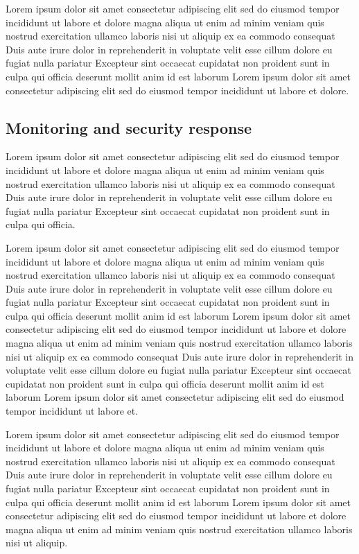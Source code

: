 Lorem ipsum dolor sit amet consectetur adipiscing elit sed do eiusmod tempor incididunt ut labore et dolore magna aliqua ut enim ad minim veniam quis nostrud exercitation ullamco laboris nisi ut aliquip ex ea commodo consequat Duis aute irure dolor in reprehenderit in voluptate velit esse cillum dolore eu fugiat nulla pariatur Excepteur sint occaecat cupidatat non proident sunt in culpa qui officia deserunt mollit anim id est laborum Lorem ipsum dolor sit amet consectetur adipiscing elit sed do eiusmod tempor incididunt ut labore et dolore.

\subsection{Monitoring and security response}
Lorem ipsum dolor sit amet consectetur adipiscing elit sed do eiusmod tempor incididunt ut labore et dolore magna aliqua ut enim ad minim veniam quis nostrud exercitation ullamco laboris nisi ut aliquip ex ea commodo consequat Duis aute irure dolor in reprehenderit in voluptate velit esse cillum dolore eu fugiat nulla pariatur Excepteur sint occaecat cupidatat non proident sunt in culpa qui officia.

Lorem ipsum dolor sit amet consectetur adipiscing elit sed do eiusmod tempor incididunt ut labore et dolore magna aliqua ut enim ad minim veniam quis nostrud exercitation ullamco laboris nisi ut aliquip ex ea commodo consequat Duis aute irure dolor in reprehenderit in voluptate velit esse cillum dolore eu fugiat nulla pariatur Excepteur sint occaecat cupidatat non proident sunt in culpa qui officia deserunt mollit anim id est laborum Lorem ipsum dolor sit amet consectetur adipiscing elit sed do eiusmod tempor incididunt ut labore et dolore magna aliqua ut enim ad minim veniam quis nostrud exercitation ullamco laboris nisi ut aliquip ex ea commodo consequat Duis aute irure dolor in reprehenderit in voluptate velit esse cillum dolore eu fugiat nulla pariatur Excepteur sint occaecat cupidatat non proident sunt in culpa qui officia deserunt mollit anim id est laborum Lorem ipsum dolor sit amet consectetur adipiscing elit sed do eiusmod tempor incididunt ut labore et.

Lorem ipsum dolor sit amet consectetur adipiscing elit sed do eiusmod tempor incididunt ut labore et dolore magna aliqua ut enim ad minim veniam quis nostrud exercitation ullamco laboris nisi ut aliquip ex ea commodo consequat Duis aute irure dolor in reprehenderit in voluptate velit esse cillum dolore eu fugiat nulla pariatur Excepteur sint occaecat cupidatat non proident sunt in culpa qui officia deserunt mollit anim id est laborum Lorem ipsum dolor sit amet consectetur adipiscing elit sed do eiusmod tempor incididunt ut labore et dolore magna aliqua ut enim ad minim veniam quis nostrud exercitation ullamco laboris nisi ut aliquip.


